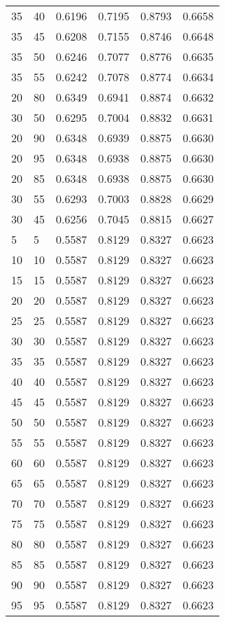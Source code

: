 \begin{center}
\begin{longtable}{|l|l|l|l|l|l|}
35 & 40 & 0.6196 & 0.7195 & 0.8793 & 0.6658 \\
35 & 45 & 0.6208 & 0.7155 & 0.8746 & 0.6648 \\
35 & 50 & 0.6246 & 0.7077 & 0.8776 & 0.6635 \\
35 & 55 & 0.6242 & 0.7078 & 0.8774 & 0.6634 \\
20 & 80 & 0.6349 & 0.6941 & 0.8874 & 0.6632 \\
30 & 50 & 0.6295 & 0.7004 & 0.8832 & 0.6631 \\
20 & 90 & 0.6348 & 0.6939 & 0.8875 & 0.6630 \\
20 & 95 & 0.6348 & 0.6938 & 0.8875 & 0.6630 \\
20 & 85 & 0.6348 & 0.6938 & 0.8875 & 0.6630 \\
30 & 55 & 0.6293 & 0.7003 & 0.8828 & 0.6629 \\
30 & 45 & 0.6256 & 0.7045 & 0.8815 & 0.6627 \\
5  & 5  & 0.5587 & 0.8129 & 0.8327 & 0.6623 \\
10 & 10 & 0.5587 & 0.8129 & 0.8327 & 0.6623 \\
15 & 15 & 0.5587 & 0.8129 & 0.8327 & 0.6623 \\
20 & 20 & 0.5587 & 0.8129 & 0.8327 & 0.6623 \\
25 & 25 & 0.5587 & 0.8129 & 0.8327 & 0.6623 \\
30 & 30 & 0.5587 & 0.8129 & 0.8327 & 0.6623 \\
35 & 35 & 0.5587 & 0.8129 & 0.8327 & 0.6623 \\
40 & 40 & 0.5587 & 0.8129 & 0.8327 & 0.6623 \\
45 & 45 & 0.5587 & 0.8129 & 0.8327 & 0.6623 \\
50 & 50 & 0.5587 & 0.8129 & 0.8327 & 0.6623 \\
55 & 55 & 0.5587 & 0.8129 & 0.8327 & 0.6623 \\
60 & 60 & 0.5587 & 0.8129 & 0.8327 & 0.6623 \\
65 & 65 & 0.5587 & 0.8129 & 0.8327 & 0.6623 \\
70 & 70 & 0.5587 & 0.8129 & 0.8327 & 0.6623 \\
75 & 75 & 0.5587 & 0.8129 & 0.8327 & 0.6623 \\
80 & 80 & 0.5587 & 0.8129 & 0.8327 & 0.6623 \\
85 & 85 & 0.5587 & 0.8129 & 0.8327 & 0.6623 \\
90 & 90 & 0.5587 & 0.8129 & 0.8327 & 0.6623 \\
95 & 95 & 0.5587 & 0.8129 & 0.8327 & 0.6623 \\

\end{longtable}
\end{center}
